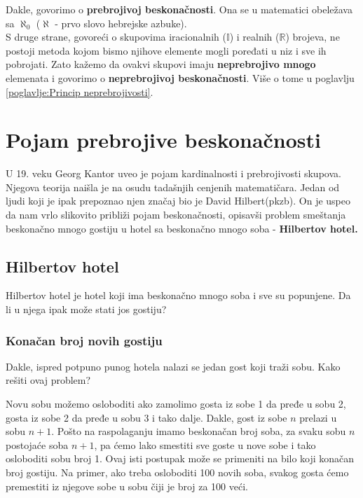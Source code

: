 \documentclass[a4paper]{article}
\begin{document}
Dakle, govorimo o \textbf{prebrojivoj beskonačnosti}. Ona se u matematici obeležava sa $\aleph_{0}$ ($\aleph$ - prvo slovo hebrejske azbuke).\\

S druge strane, govoreći o skupovima iracionalnih ($\mathbb{I}$) i realnih ($\mathbb{R}$) brojeva, ne postoji metoda kojom bismo njihove elemente mogli poređati u niz i sve ih pobrojati. Zato kažemo da ovakvi skupovi imaju \textbf{neprebrojivo mnogo} elemenata i govorimo o \textbf{neprebrojivoj beskonačnosti}. Više o tome u poglavlju \ref{poglavlje:Princip neprebrojivosti}.


\newpage

\section{Pojam prebrojive beskonačnosti}
\label{poglavlje:Pojam prebrojive beskonačnosti}
U 19. veku Georg Kantor uveo je pojam kardinalnosti i prebrojivosti skupova. Njegova teorija naišla je na osudu tadašnjih cenjenih matematičara.
Jedan od ljudi koji je ipak prepoznao njen značaj bio je David Hilbert(pkzb).
On je uspeo da nam vrlo slikovito približi pojam beskonačnosti, opisavši problem smeštanja beskonačno mnogo gostiju u hotel sa beskonačno mnogo soba - \textbf{Hilbertov hotel.}

\subsection{Hilbertov hotel}
Hilbertov hotel je hotel koji ima beskonačno mnogo soba i sve su popunjene. Da li u njega ipak može stati jos gostiju?

\subsubsection{Konačan broj novih gostiju}
\label{potpotpoglavlje:Konačan broj novih gostiju}
Dakle, ispred potpuno punog hotela nalazi se jedan gost koji traži sobu. Kako rešiti ovaj problem?

Novu sobu možemo osloboditi ako zamolimo gosta iz sobe 1 da pređe u sobu 2, gosta iz sobe 2 da pređe u sobu 3 i tako dalje. Dakle, gost iz sobe $n$ prelazi u sobu $n+1$.
Pošto na raspolaganju imamo beskonačan broj soba, za svaku sobu $n$ postojaće soba $n+1$, pa ćemo lako smestiti sve goste u nove sobe i tako osloboditi sobu broj 1.
Ovaj isti postupak može se primeniti na bilo koji konačan broj gostiju. Na primer, ako treba osloboditi 100 novih soba, svakog gosta ćemo premestiti iz njegove sobe u sobu čiji je broj za 100 veći.
\end{document}
